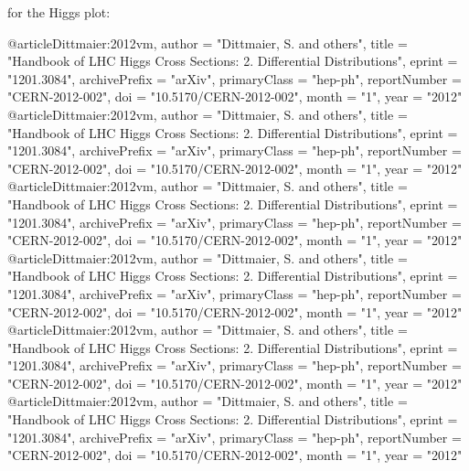 


for the Higgs plot:

@article{Dittmaier:2012vm,
    author = "Dittmaier, S. and others",
    title = "{Handbook of LHC Higgs Cross Sections: 2. Differential Distributions}",
    eprint = "1201.3084",
    archivePrefix = "arXiv",
    primaryClass = "hep-ph",
    reportNumber = "CERN-2012-002",
    doi = "10.5170/CERN-2012-002",
    month = "1",
    year = "2012"
}@article{Dittmaier:2012vm,
    author = "Dittmaier, S. and others",
    title = "{Handbook of LHC Higgs Cross Sections: 2. Differential Distributions}",
    eprint = "1201.3084",
    archivePrefix = "arXiv",
    primaryClass = "hep-ph",
    reportNumber = "CERN-2012-002",
    doi = "10.5170/CERN-2012-002",
    month = "1",
    year = "2012"
}@article{Dittmaier:2012vm,
    author = "Dittmaier, S. and others",
    title = "{Handbook of LHC Higgs Cross Sections: 2. Differential Distributions}",
    eprint = "1201.3084",
    archivePrefix = "arXiv",
    primaryClass = "hep-ph",
    reportNumber = "CERN-2012-002",
    doi = "10.5170/CERN-2012-002",
    month = "1",
    year = "2012"
}@article{Dittmaier:2012vm,
    author = "Dittmaier, S. and others",
    title = "{Handbook of LHC Higgs Cross Sections: 2. Differential Distributions}",
    eprint = "1201.3084",
    archivePrefix = "arXiv",
    primaryClass = "hep-ph",
    reportNumber = "CERN-2012-002",
    doi = "10.5170/CERN-2012-002",
    month = "1",
    year = "2012"
}@article{Dittmaier:2012vm,
    author = "Dittmaier, S. and others",
    title = "{Handbook of LHC Higgs Cross Sections: 2. Differential Distributions}",
    eprint = "1201.3084",
    archivePrefix = "arXiv",
    primaryClass = "hep-ph",
    reportNumber = "CERN-2012-002",
    doi = "10.5170/CERN-2012-002",
    month = "1",
    year = "2012"
}@article{Dittmaier:2012vm,
    author = "Dittmaier, S. and others",
    title = "{Handbook of LHC Higgs Cross Sections: 2. Differential Distributions}",
    eprint = "1201.3084",
    archivePrefix = "arXiv",
    primaryClass = "hep-ph",
    reportNumber = "CERN-2012-002",
    doi = "10.5170/CERN-2012-002",
    month = "1",
    year = "2012"
}
